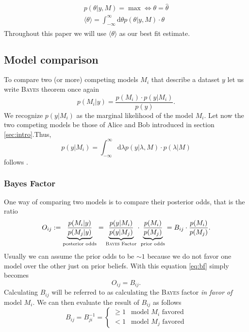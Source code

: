 \documentclass[%
 reprint,
 amsmath,amssymb,
 aps,
]{revtex4-1}
\begin{document}
\begin{align}
	\begin{split}
		p(\theta|y,M)=\max \Leftrightarrow \theta=\hat{\theta}\\
		\langle\theta\rangle=\int_{-\infty}^{\infty}\text{d}\theta  p(\theta|y,M)\cdot\theta
	\end{split}
\end{align}
Throughout this paper we will use $\langle\theta\rangle$ as our best fit estimate. \cite{sivia}

\subsection{Model comparison}\label{sec:Model_comparison}
\noindent To compare two (or more) competing models $M_i$ that describe a dataset $y$ let us write \textsc{Bayes} theorem once again
\begin{equation}
	p(M_i|y)=\frac{p(M_i)\cdot p(y|M_i)}{p(y)}.
\end{equation}
We recognize $p(y|M_i)$ as the marginal likelihood of the model $M_i$. Let now  the two competing models be those of Alice and Bob introduced in section \eqref{sec:intro}.Thus, $$p(y|M_i)=\int_{-\infty}^{\infty}\text{d}\lambda p(y|\lambda, M)\cdot p(\lambda|M)$$
follows \cite[Chap. 3]{sivia}.
\subsubsection{\textbf{Bayes Factor}}
One way of comparing two models is to compare their posterior odds, that is the ratio \cite{Trotta_2008} 
\begin{equation}\label{eq:bf}
	O_{ij}:=\underbrace{\frac{p(M_i|y)}{p(M_j|y)}}_{\text{posterior odds}}=\underbrace{\frac{p(y|M_i)}{p(y|M_j)}}_{\text{\textsc{Bayes} Factor}}\cdot\underbrace{\frac{p(M_i)}{p(M_j)}}_{\text{prior odds}}=B_{ij}\cdot\frac{p(M_i)}{p(M_j)}.
\end{equation}
Usually we can assume the prior odds to be $\sim 1$ because we do not favor one model over the other just on prior beliefs. With this equation \eqref{eq:bf} simply becomes $$O_{ij}=B_{ij}.$$
Calculating $B_{ij}$ will be referred to as calculating the \textsc{Bayes} factor \emph{in favor of} model $M_i$. We can then evaluate the result of $B_{ij}$ as follows 
\begin{equation*}
	B_{ij}=B_{ji}^{-1}=\begin{cases} \geq 1 & \text{model } M_i \text{ favored}\\
	 <1 & \text{model } M_j \text{ favored}
	\end{cases}
\end{equation*}
\end{document}
